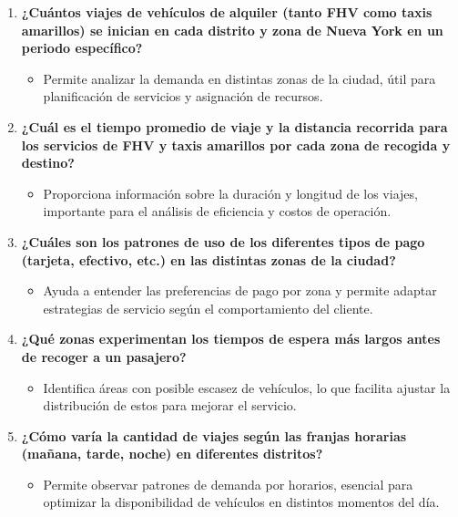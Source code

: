 \documentclass{article}
\begin{document}
\begin{enumerate}[label=\arabic*.]
    \item \textbf{¿Cuántos viajes de vehículos de alquiler (tanto FHV como taxis amarillos) se inician en cada distrito y zona de Nueva York en un periodo específico?}
    \begin{itemize}
        \item Permite analizar la demanda en distintas zonas de la ciudad, útil para planificación de servicios y asignación de recursos.
    \end{itemize}
    
    \item \textbf{¿Cuál es el tiempo promedio de viaje y la distancia recorrida para los servicios de FHV y taxis amarillos por cada zona de recogida y destino?}
    \begin{itemize}
        \item Proporciona información sobre la duración y longitud de los viajes, importante para el análisis de eficiencia y costos de operación.
    \end{itemize}
    
    \item \textbf{¿Cuáles son los patrones de uso de los diferentes tipos de pago (tarjeta, efectivo, etc.) en las distintas zonas de la ciudad?}
    \begin{itemize}
        \item Ayuda a entender las preferencias de pago por zona y permite adaptar estrategias de servicio según el comportamiento del cliente.
    \end{itemize}
    
    \item \textbf{¿Qué zonas experimentan los tiempos de espera más largos antes de recoger a un pasajero?}
    \begin{itemize}
        \item Identifica áreas con posible escasez de vehículos, lo que facilita ajustar la distribución de estos para mejorar el servicio.
    \end{itemize}
    
    \item \textbf{¿Cómo varía la cantidad de viajes según las franjas horarias (mañana, tarde, noche) en diferentes distritos?}
    \begin{itemize}
        \item Permite observar patrones de demanda por horarios, esencial para optimizar la disponibilidad de vehículos en distintos momentos del día.
    \end{itemize}
    

\end{enumerate}
\end{document}
